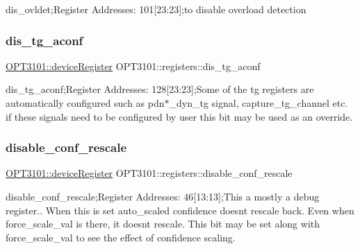 dis\+\_\+ovldet;Register Addresses\+: 101\mbox{[}23\+:23\mbox{]};to disable overload detection 

\mbox{\label{class_o_p_t3101_1_1registers_af37f171c335d8995b3ce666501c18dbe}} 
\subsubsection{\texorpdfstring{dis\+\_\+tg\+\_\+aconf}{dis\_tg\_aconf}}
{\footnotesize\ttfamily \mbox{\hyperlink{class_o_p_t3101_1_1device_register}{O\+P\+T3101\+::device\+Register}} O\+P\+T3101\+::registers\+::dis\+\_\+tg\+\_\+aconf}



dis\+\_\+tg\+\_\+aconf;Register Addresses\+: 128\mbox{[}23\+:23\mbox{]};Some of the tg registers are automatically configured such as pdn$\ast$\+\_\+dyn\+\_\+tg signal, capture\+\_\+tg\+\_\+channel etc. if these signals need to be configured by user this bit may be used as an override. 

\mbox{\label{class_o_p_t3101_1_1registers_a2cf64206b57b26fb7a65e15dc2e6ccda}} 
\subsubsection{\texorpdfstring{disable\+\_\+conf\+\_\+rescale}{disable\_conf\_rescale}}
{\footnotesize\ttfamily \mbox{\hyperlink{class_o_p_t3101_1_1device_register}{O\+P\+T3101\+::device\+Register}} O\+P\+T3101\+::registers\+::disable\+\_\+conf\+\_\+rescale}



disable\+\_\+conf\+\_\+rescale;Register Addresses\+: 46\mbox{[}13\+:13\mbox{]};This a mostly a debug register.. When this is set auto\+\_\+scaled confidence doesn\textquotesingle{}t rescale back. Even when force\+\_\+scale\+\_\+val is there, it doesn\textquotesingle{}t rescale. This bit may be set along with force\+\_\+scale\+\_\+val to see the effect of confidence scaling. 

